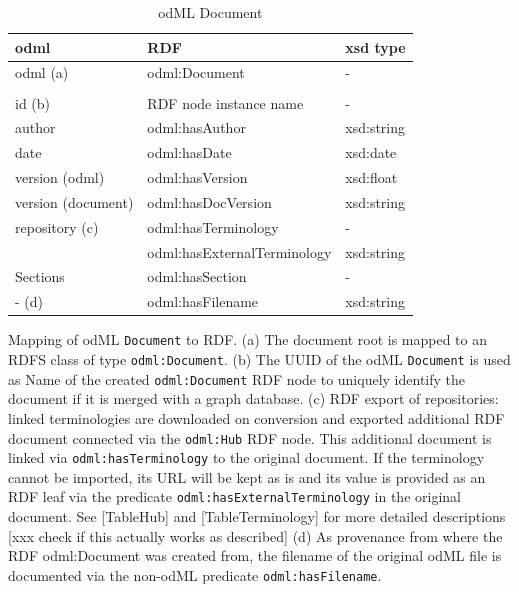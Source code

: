 \documentclass{article}
\begin{document}
\begin{table}
\begin{threeparttable}
\begin{tabular}{lll}
\toprule
    odml                    & RDF                                 & xsd type \\
\midrule
    odml (a)                & odml:Document                       & - \\
                            & & \\
    id (b)                  & RDF node instance name              & - \\
    author                  & odml:hasAuthor                      & xsd:string \\
    date                    & odml:hasDate                        & xsd:date \\
    version (odml)          & odml:hasVersion                     & xsd:float \\
    version (document)      & odml:hasDocVersion                  & xsd:string \\
    repository (c)          & odml:hasTerminology                 & - \\
                            & odml:hasExternalTerminology         & xsd:string \\
    Sections                & odml:hasSection                     & - \\
    - (d)                   & odml:hasFilename                    & xsd:string \\
\bottomrule
\end{tabular}
\caption{odML Document}
\begin{tablenotes}
\small
\item Mapping of odML \texttt{Document} to RDF. (a) The document root is mapped to an RDFS class of type \texttt{odml:Document}. (b) The UUID of the odML \texttt{Document} is used as Name of the created \texttt{odml:Document} RDF node to uniquely identify the document if it is merged with a graph database. (c) RDF export of repositories: linked terminologies are downloaded on conversion and exported additional RDF document connected via the \texttt{odml:Hub} RDF node. This additional document is linked via \texttt{odml:hasTerminology} to the original document. If the terminology cannot be imported, its URL will be kept as is and its value is provided as an RDF leaf via the predicate \texttt{odml:hasExternalTerminology} in the original document. See [TableHub] and [TableTerminology] for more detailed descriptions [xxx check if this actually works as described] (d) As provenance from where the RDF odml:Document was created from, the filename of the original odML file is documented via the non-odML predicate \texttt{odml:hasFilename}.
\end{tablenotes}
\label{table:Document}
\end{threeparttable}
\end{table}
\end{document}
